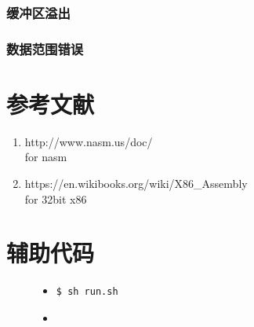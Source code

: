 \documentclass[a4paper]{article}
\begin{document}
        \subsubsection{缓冲区溢出}
        \subsubsection{数据范围错误}

\begin{appendices}
\section{参考文献} \label{sec:reference}
\begin{enumerate}
    \item http://www.nasm.us/doc/ \\
    for nasm
    \item https://en.wikibooks.org/wiki/X86\_Assembly \\
    for 32bit x86
  \end{enumerate}
    \section{辅助代码}\label{sec:utilitycode}
    \begin{figure}
    \begin{itemize}
    \item[] \begin{lstlisting}[language=sh, label=lst:run, caption=运行本项目的方法]
$ sh run.sh
    \end{lstlisting}
    \end{itemize}
    \end{figure}
    \begin{figure}
    \begin{itemize}
        \item[]
    \end{itemize}
    \end{figure}
\end{appendices}
\end{document}
